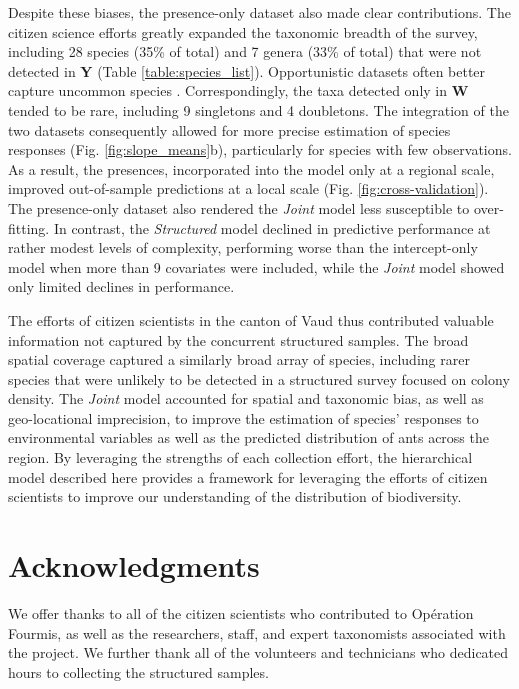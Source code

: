 \documentclass[preprint,final,times,12pt,3p]{elsarticle}
\begin{document}
Despite these biases, the presence-only dataset also made clear contributions. The citizen science efforts greatly expanded the taxonomic breadth of the survey, including 28 species (35\% of total) and 7 genera (33\% of total) that were not detected in \textbf{Y} (Table \ref{table:species_list}). Opportunistic datasets often better capture uncommon species \citep{Henckel2020}. Correspondingly, the taxa detected only in \textbf{W} tended to be rare, including 9 singletons and 4 doubletons. The integration of the two datasets consequently allowed for more precise estimation of species responses (Fig. \ref{fig:slope_means}b), particularly for species with few observations. As a result, the presences, incorporated into the model only at a regional scale, improved out-of-sample predictions at a local scale (Fig. \ref{fig:cross-validation}). The presence-only dataset also rendered the \emph{Joint} model less susceptible to over-fitting. In contrast, the \emph{Structured} model declined in predictive performance at rather modest levels of complexity, performing worse than the intercept-only model when more than 9 covariates were included, while the \emph{Joint} model showed only limited declines in performance. 

The efforts of citizen scientists in the canton of Vaud thus contributed valuable information not captured by the concurrent structured samples. The broad spatial coverage captured a similarly broad array of species, including rarer species that were unlikely to be detected in a structured survey focused on colony density. The \emph{Joint} model accounted for spatial and taxonomic bias, as well as geo-locational imprecision, to improve the estimation of species' responses to environmental variables as well as the predicted distribution of ants across the region. By leveraging the strengths of each collection effort, the hierarchical model described here provides a framework for leveraging the efforts of citizen scientists to improve our understanding of the distribution of biodiversity.




\section{Acknowledgments}
We offer thanks to all of the citizen scientists who contributed to Opération Fourmis, as well as the researchers, staff, and expert taxonomists associated with the project. We further thank all of the volunteers and technicians who dedicated hours to collecting the structured samples.
\end{document}
